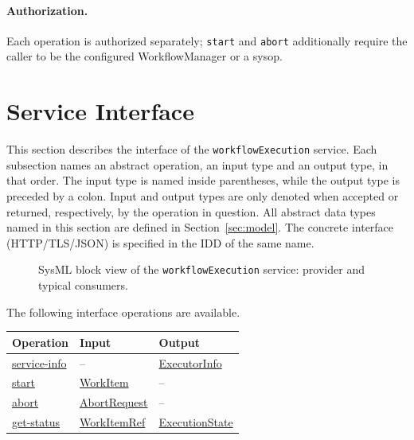 \documentclass[a4paper]{arrowhead}
\newcommand{\mref}[1]{{\textcolor{ArrowheadPurple}{\hyperref[sec:model:#1]{#1}}}}
\newcommand{\oref}[1]{{\textcolor{ArrowheadBlue}{\hyperref[sec:operations:#1]{#1}}}}
\begin{document}
\paragraph{Authorization.} Each operation is authorized separately; \texttt{start} and \texttt{abort} additionally require the caller to be the configured WorkflowManager or a sysop.

\newpage
\section{Service Interface}
\label{sec:operations}
This section describes the interface of the \texttt{workflow\allowbreak{}Execution} service. Each subsection names an abstract operation,
an input type and an output type, in that order. The input type is named inside parentheses, while the output type is
preceded by a colon. Input and output types are only denoted when accepted or returned, respectively, by the operation
in question. All abstract data types named in this section are defined in Section~\ref{sec:model}. The concrete
interface (HTTP/TLS/JSON) is specified in the IDD of the same name.

\begin{figure}[ht!]
  \centering
  \caption{SysML block view of the \texttt{workflowExecution} service: provider and typical consumers.}
  \label{fig:SD}
\end{figure}

The following interface operations are available.

{\small
\begin{longtable}{|p{4.4cm}|p{5.6cm}|p{5.8cm}|}

\hline
\rowcolor{gray!33} Operation & Input & Output \\ \hline
\endhead
\oref{service-info} & -- & \mref{ExecutorInfo} \\ \hline
\oref{start} & \mref{WorkItem} & -- \\ \hline
\oref{abort} & \mref{AbortRequest} & -- \\ \hline
\oref{get-status} & \mref{WorkItemRef} & \mref{ExecutionState} \\ \hline
\end{longtable}
}
\end{document}
